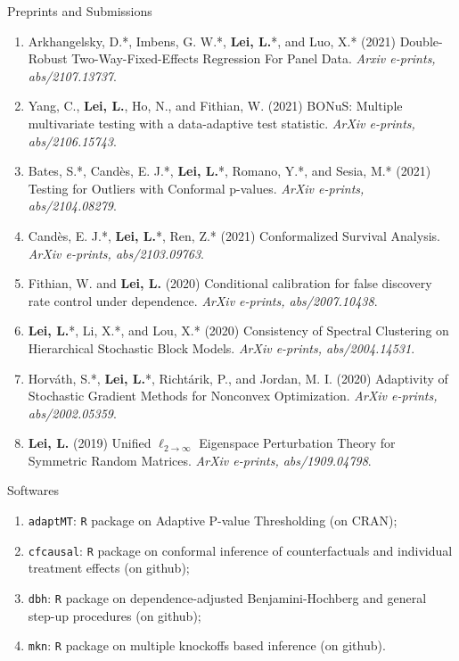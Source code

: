 \documentclass{article}
\begin{document}
\begin{large}
\noindent Preprints and Submissions
\end{large}

\begin{enumerate}
\item Arkhangelsky, D.*, Imbens, G. W.*, \textbf{Lei, L.}*, and Luo, X.* (2021) Double-Robust Two-Way-Fixed-Effects Regression For Panel Data. \emph{Arxiv e-prints, abs/2107.13737}.
\item Yang, C., \textbf{Lei, L.}, Ho, N., and Fithian, W. (2021) BONuS: Multiple multivariate testing with a data-adaptive test statistic. \emph{ArXiv e-prints, abs/2106.15743}.
\item Bates, S.*, Cand\`{e}s, E. J.*, \textbf{Lei, L.}*, Romano, Y.*, and Sesia, M.* (2021) Testing for Outliers with Conformal p-values. \emph{ArXiv e-prints, abs/2104.08279}.
\item Cand\`{e}s, E. J.*, \textbf{Lei, L.}*, Ren, Z.* (2021) Conformalized Survival Analysis. \emph{ArXiv e-prints, abs/2103.09763}.
\item Fithian, W. and \textbf{Lei, L.} (2020) Conditional calibration for false discovery rate control under dependence. \emph{ArXiv e-prints, abs/2007.10438}.
\item \textbf{Lei, L.}*, Li, X.*, and Lou, X.* (2020) Consistency of Spectral Clustering on Hierarchical Stochastic Block Models. \emph{ArXiv e-prints, abs/2004.14531}.
\item Horv\'{a}th, S.*, \textbf{Lei, L.}*, Richt\'{a}rik, P., and Jordan, M. I. (2020) Adaptivity of Stochastic Gradient Methods for Nonconvex Optimization. \emph{ArXiv e-prints, abs/2002.05359}.
\item \textbf{Lei, L.} (2019) Unified $\ell_{2\rightarrow\infty}$ Eigenspace Perturbation Theory for Symmetric Random Matrices. \emph{ArXiv e-prints, abs/1909.04798}.
\end{enumerate}

\begin{large}
\noindent Softwares 
\end{large}

\begin{enumerate}
\item \texttt{adaptMT}: \texttt{R} package on Adaptive P-value Thresholding (on CRAN);
\item \texttt{cfcausal}: \texttt{R} package on conformal inference of counterfactuals and individual treatment effects (on github);
\item \texttt{dbh}: \texttt{R} package on dependence-adjusted Benjamini-Hochberg and general step-up procedures (on github);
\item \texttt{mkn}: \texttt{R} package on multiple knockoffs based inference (on github).
\end{enumerate}
\end{document}
